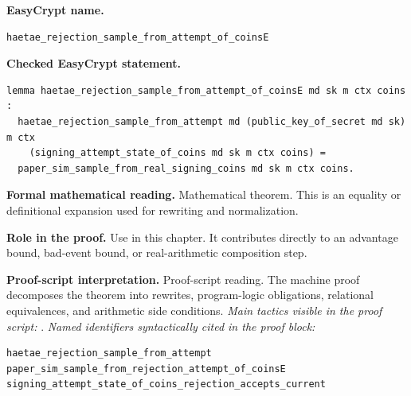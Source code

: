 \begin{formaltheorem}
\noindent\textbf{EasyCrypt name.}
\begin{lstlisting}[language=EasyCrypt,basicstyle=\ttfamily\scriptsize]
haetae_rejection_sample_from_attempt_of_coinsE
\end{lstlisting}
\noindent\textbf{Checked EasyCrypt statement.}
\begin{lstlisting}[language=EasyCrypt,basicstyle=\ttfamily\scriptsize]
lemma haetae_rejection_sample_from_attempt_of_coinsE md sk m ctx coins :
  haetae_rejection_sample_from_attempt md (public_key_of_secret md sk) m ctx
    (signing_attempt_state_of_coins md sk m ctx coins) =
  paper_sim_sample_from_real_signing_coins md sk m ctx coins.
\end{lstlisting}
\noindent\textbf{Formal mathematical reading.}
Mathematical theorem. This is an equality or definitional expansion used for rewriting and normalization.

\noindent\textbf{Role in the proof.}
Use in this chapter. It contributes directly to an advantage bound, bad-event bound, or real-arithmetic composition step.

\noindent\textbf{Proof-script interpretation.}
Proof-script reading. The machine proof decomposes the theorem into rewrites, program-logic obligations, relational equivalences, and arithmetic side conditions.
\emph{Main tactics visible in the proof script:} .
\emph{Named identifiers syntactically cited in the proof block:}
\begin{lstlisting}[language=EasyCrypt,basicstyle=\ttfamily\scriptsize]
haetae_rejection_sample_from_attempt
paper_sim_sample_from_rejection_attempt_of_coinsE
signing_attempt_state_of_coins_rejection_accepts_current
\end{lstlisting}

\end{formaltheorem}

